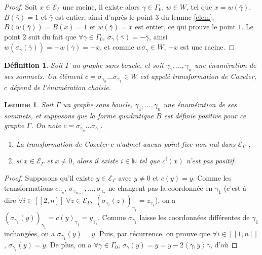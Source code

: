 \documentclass[a4paper,10pt]{article}
\newtheorem{lm}[]{Lemme}[section]
\newtheorem{defi}[]{Définition}[section]
\newcommand{\ps}[2]{\left\langle#1,#2\right\rangle}
\newcommand{\EG}{\mathscr{E}_\Gamma}
\newcommand{\ent}[2]{[\![#1,#2]\!]}
\begin{document}
\begin{proof}
	Soit $x\in\EG$ une racine, il existe alors $\gamma\in\Gamma_0$, $w\in W$, tel que $x=w(\bar\gamma)$. $B(\bar\gamma)=1$ et $\bar\gamma$ est entier, ainsi d'après le point $3$ du lemme \ref{elem}, $B(w(\bar\gamma))=B(x)=1$ et $w(\bar\gamma)=x$ est entier, ce qui prouve le point $1$. Le point $2$ suit du fait que $\forall\gamma\in\Gamma_0$, $\sigma_\gamma(\bar\gamma)=-\bar\gamma$, ainsi $w(\sigma_\gamma(\bar\gamma))=-w(\bar\gamma)=-x$, et comme $w\sigma_\gamma\in W$, $-x$ est une racine.
\end{proof}
\begin{defi}
	Soit $\Gamma$ un graphe sans boucle, et soit $\gamma_1,\dots,\gamma_n$ une énumération de ses sommets. Un élément $c=\sigma_{\gamma_n}\dots\sigma_{\gamma_1}\in W$ est appelé transformation de Coxeter, $c$ dépend de l'énumération choisie.
\end{defi}
\begin{lm}
Soit $\Gamma$ un graphe sans boucle, $\gamma_1,\dots,\gamma_n$ une énumération de ses sommets, et supposons que la forme quadratique $B$ est définie positive pour ce graphe $\Gamma$. On note $c=\sigma_{\gamma_n}\dots\sigma_{\gamma_1}$.
\begin{enumerate}
	\item La transformation de Coxeter $c$ n'admet aucun point fixe non nul dans $\EG$ ;
	\item si $x\in\EG$ et $x\neq0$, alors il existe $i\in\mathbb N$ tel que $c^i(x)$ n'est pas positif.
\end{enumerate}
\end{lm}
\begin{proof}
	Supposons qu'il existe $y\in\EG$ avec $y\neq0$ et $c(y)=y$. Comme les transformations $\sigma_{\gamma_n}$, $\sigma_{\gamma_{n-1}},\dots,\sigma_{\gamma_2}$ ne changent pas la coordonnée en $\gamma_1$ (c'est-à-dire $\forall i\in\ent{2}{n}\;\forall z\in\EG,\;(\sigma_{\gamma_i}(z))_{\gamma_1}=z_{\gamma_1}$), on a $(\sigma_{\gamma_1}(y))_{\gamma_1}=c(y)_{\gamma_1}=y_{\gamma_1}$. Comme $\sigma_{\gamma_1}$ laisse les coordonnées différentes de $\gamma_1$ inchangées, on a $\sigma_{\gamma_1}(y)=y$. Puis, par récurrence, on prouve que $\forall i\in\ent{1}{n}$, $\sigma_{\gamma_i}(y)=y$. De plus, on a $\forall\gamma\in\Gamma_0$, $\sigma_{\gamma}(y)=y=y-2\ps{\bar\gamma}{y}\bar\gamma$, d'où 
\end{proof}
\clearpage


\end{document}
